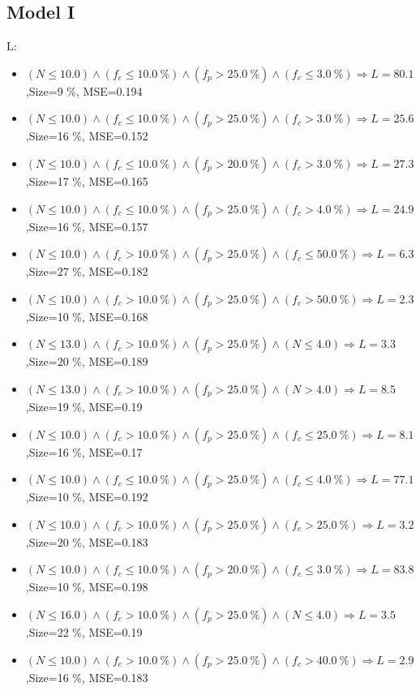 \documentclass[numbered]{CSL}
\begin{document}
\subsection{Model I}
L:
\begin{itemize}
\item $(N \leq 10.0) \land (f_c \leq 10.0~\%) \land (f_p > 25.0~\%) \land (f_c \leq 3.0~\%) \Rightarrow L = 80.1$,\hfill Size=9 \%, MSE=0.194
\item $(N \leq 10.0) \land (f_c \leq 10.0~\%) \land (f_p > 25.0~\%) \land (f_c > 3.0~\%) \Rightarrow L = 25.6$,\hfill Size=16 \%, MSE=0.152
\item $(N \leq 10.0) \land (f_c \leq 10.0~\%) \land (f_p > 20.0~\%) \land (f_c > 3.0~\%) \Rightarrow L = 27.3$,\hfill Size=17 \%, MSE=0.165
\item $(N \leq 10.0) \land (f_c \leq 10.0~\%) \land (f_p > 25.0~\%) \land (f_c > 4.0~\%) \Rightarrow L = 24.9$,\hfill Size=16 \%, MSE=0.157
\item $(N \leq 10.0) \land (f_c > 10.0~\%) \land (f_p > 25.0~\%) \land (f_c \leq 50.0~\%) \Rightarrow L = 6.3$,\hfill Size=27 \%, MSE=0.182
\item $(N \leq 10.0) \land (f_c > 10.0~\%) \land (f_p > 25.0~\%) \land (f_c > 50.0~\%) \Rightarrow L = 2.3$,\hfill Size=10 \%, MSE=0.168
\item $(N \leq 13.0) \land (f_c > 10.0~\%) \land (f_p > 25.0~\%) \land (N \leq 4.0) \Rightarrow L = 3.3$,\hfill Size=20 \%, MSE=0.189
\item $(N \leq 13.0) \land (f_c > 10.0~\%) \land (f_p > 25.0~\%) \land (N > 4.0) \Rightarrow L = 8.5$,\hfill Size=19 \%, MSE=0.19
\item $(N \leq 10.0) \land (f_c > 10.0~\%) \land (f_p > 25.0~\%) \land (f_c \leq 25.0~\%) \Rightarrow L = 8.1$,\hfill Size=16 \%, MSE=0.17
\item $(N \leq 10.0) \land (f_c \leq 10.0~\%) \land (f_p > 25.0~\%) \land (f_c \leq 4.0~\%) \Rightarrow L = 77.1$,\hfill Size=10 \%, MSE=0.192
\item $(N \leq 10.0) \land (f_c > 10.0~\%) \land (f_p > 25.0~\%) \land (f_c > 25.0~\%) \Rightarrow L = 3.2$,\hfill Size=20 \%, MSE=0.183
\item $(N \leq 10.0) \land (f_c \leq 10.0~\%) \land (f_p > 20.0~\%) \land (f_c \leq 3.0~\%) \Rightarrow L = 83.8$,\hfill Size=10 \%, MSE=0.198
\item $(N \leq 16.0) \land (f_c > 10.0~\%) \land (f_p > 25.0~\%) \land (N \leq 4.0) \Rightarrow L = 3.5$,\hfill Size=22 \%, MSE=0.19
\item $(N \leq 10.0) \land (f_c > 10.0~\%) \land (f_p > 25.0~\%) \land (f_c > 40.0~\%) \Rightarrow L = 2.9$,\hfill Size=16 \%, MSE=0.183

\end{itemize}
\end{document}
